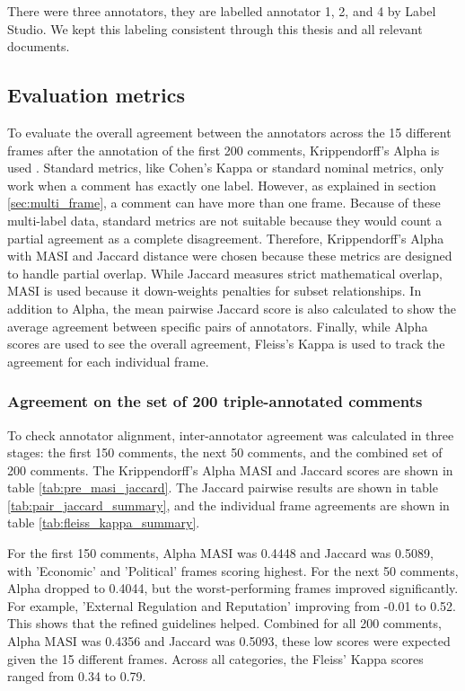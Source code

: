\documentclass[
10pt, %
a4paper, %
oneside, %
headinclude,footinclude, %
] {book}%
\begin{document}
There were three annotators, they are labelled  annotator 1, 2, and 4 by Label Studio. We kept this labeling consistent through this thesis and all relevant documents.




\subsection{Evaluation metrics}
To evaluate the overall agreement between the annotators across the 15 different frames after the annotation of the first 200 comments, Krippendorff's Alpha is used \citep{krippendorff2018content}. Standard metrics, like Cohen's Kappa or standard nominal metrics, only work when a comment has exactly one label. However, as explained in section \ref{sec:multi_frame}, a comment can have more than one frame. Because of these multi-label data, standard metrics are not suitable because they would count a partial agreement as a complete disagreement. 
Therefore, Krippendorff's Alpha with MASI \citep{passonneau2006measuring} and Jaccard distance \citep{jaccard1912distribution} were chosen because these metrics are designed to handle partial overlap. 
While Jaccard measures strict mathematical overlap, MASI is used because it down-weights penalties for subset relationships. In addition to Alpha, the mean pairwise Jaccard score is also calculated to show the average agreement between specific pairs of annotators.
Finally, while Alpha scores are used to see the overall agreement, Fleiss's Kappa \citep{fleiss1971measuring} is used to track the agreement for each individual frame.

\subsubsection{Agreement on the set of 200 triple-annotated comments}
To check annotator alignment, inter-annotator agreement was calculated in three stages: the first 150 comments, the next 50 comments, and the combined set of 200 comments. The Krippendorff's Alpha MASI and Jaccard scores are shown in table \ref{tab:pre_masi_jaccard}. The Jaccard pairwise results are shown in table \ref{tab:pair_jaccard_summary}, and the individual frame agreements are shown in table \ref{tab:fleiss_kappa_summary}.

For the first 150 comments, Alpha MASI was 0.4448 and Jaccard was 0.5089, with 'Economic' and 'Political' frames scoring highest. For the next 50 comments, Alpha dropped to 0.4044, but the worst-performing frames improved significantly. For example, 'External Regulation and Reputation' improving from -0.01 to 0.52. This shows that the refined guidelines helped. Combined for all 200 comments, Alpha MASI was 0.4356 and Jaccard was 0.5093, these low scores were expected given the 15 different frames. Across all categories, the Fleiss' Kappa scores ranged from 0.34 to 0.79.
\end{document}
